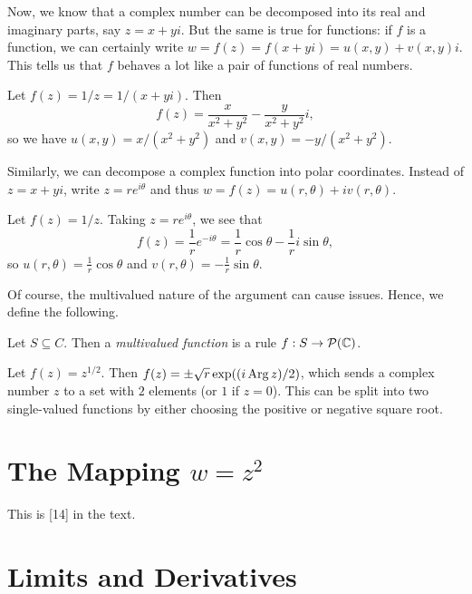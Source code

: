 \documentclass{article}
\begin{document}
Now, we know that a complex number can be decomposed into its real and imaginary parts, say $z = x+yi$. But the same is true for functions: if $f$ is a function, we can certainly write $w = f(z) = f(x+yi) = u(x,y) + v(x,y)i$. This tells us that $f$ behaves a lot like a pair of functions of real numbers.
\begin{example}
Let $f(z) = 1/z = 1/(x+yi)$. Then
$$f(z) = \frac x{x^2+y^2} - \frac{y}{x^2+y^2}i,$$
so we have $u(x,y) = x/(x^2+y^2)$ and $v(x,y) = -y/(x^2+y^2)$.
\end{example}

Similarly, we can decompose a complex function into polar coordinates. Instead of $z=  x+yi$, write $z=re^{i\theta}$ and thus $w=f(z) = u(r, \theta) + iv(r, \theta)$.
\begin{example}
Let $f(z) = 1/z$. Taking $z=re^{i\theta}$, we see that
$$f(z) = \frac 1re^{-i\theta} = \frac 1r\cos\theta - \frac 1ri\sin\theta,$$
so $u(r,\theta) = \frac 1r\cos\theta$ and $v(r, \theta) = -\frac 1r\sin\theta$.
\end{example}
Of course, the multivalued nature of the argument can cause issues. Hence, we define the following.
\begin{definition}
Let $S\subseteq C$. Then a \textit{multivalued function} is a rule $f: S\to \mathcal P(\mathbb C)$.
\end{definition}
\begin{example}
Let $f(z)= z^{1/2}$. Then $f(z) = \pm \sqrt r\exp((i\operatorname{Arg} z)/2)$, which sends a complex number $z$ to a set with $2$ elements (or $1$ if $z=0$). This can be split into two single-valued functions by either choosing the positive or negative square root.
\end{example}
\setcounter{section}{22}
\section{The Mapping $w=z^2$}
This is [14] in the text.
\newpage

\section{Limits and Derivatives}
\end{document}
